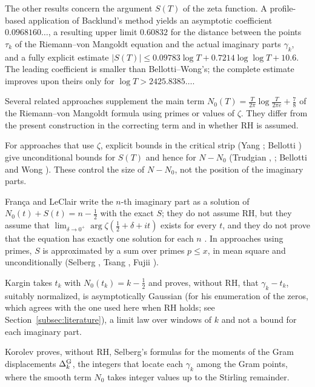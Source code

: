 \documentclass[11pt,a4paper]{article}
\makeatletter
\numberwithin{equation}{section}
\DeclareRobustCommand{\CGref}[1]{\ref{#1}}
\DeclareRobustCommand{\CGcite}[2][]{\if\relax\detokenize{#1}\relax\cite{#2}\else\cite[#1]{#2}\fi}
\let\CG@origref\ref
\newcommand{\CG@gettip}[1]{\@ifundefined{CGTip@#1}{#1}{\csname CGTip@#1\endcsname}}
\newcommand{\CG@getbib}[1]{\@ifundefined{CGBib@#1}{#1}{\csname CGBib@#1\endcsname}}
\DeclareRobustCommand{\CGref}[1]{\pdftooltip{\CG@origref{#1}}{\CG@gettip{#1}}}
\DeclareRobustCommand{\CGcite}[2][]{\pdftooltip{\if\relax\detokenize{#1}\relax\cite{#2}\else\cite[#1]{#2}\fi}{\CG@getbib{#2}}}
\theoremstyle{definition}
\theoremstyle{remark}
\newcommand{\Nz}{N_0} %
\makeatother
\begin{document}
The other results concern the argument $S(T)$ of the zeta function. A profile-based application of Backlund's method yields an asymptotic coefficient $0.0968160\ldots$, a resulting upper limit $0.60832$ for the distance between the points $\tau_k$ of the Riemann--von Mangoldt equation and the actual imaginary parts $\gamma_k$, and a fully explicit estimate $|S(T)|\le0.09783\log T+0.7214\log\log T+10.6$. The leading coefficient is smaller than Bellotti--Wong's; the complete estimate improves upon theirs only for $\log T>2425.8385\ldots$.

Several related approaches supplement the main term $\Nz(T)=\frac{T}{2\pi}\log\frac{T}{2\pi e}+\frac78$ of the Riemann--von Mangoldt formula using primes or values of $\zeta$. They differ from the present construction in the correcting term and in whether RH is assumed.

For approaches that use $\zeta$, explicit bounds in the critical strip (Yang \CGcite{Yang2024}; Bellotti \CGcite{Bellotti2024}) give unconditional bounds for $S(T)$ and hence for $N-\Nz$ (Trudgian \CGcite{Trudgian2012}, \CGcite{Trudgian2014}; Bellotti and Wong \CGcite[Thm.~1.1, Cor.~1.5]{BellottiWong2025}). These control the size of $N-\Nz$, not the position of the imaginary parts.

Fran\c{c}a and LeClair \CGcite[eq.~(20)]{FrancaLeClair2015} write the $n$-th imaginary part as a solution of $\Nz(t)+S(t)=n-\frac12$ with the exact $S$; they do not assume RH, but they assume that $\lim_{\delta\to0^+}\arg\zeta(\frac12+\delta+it)$ exists for every $t$, and they do not prove that the equation has exactly one solution for each $n$ \CGcite[\S9]{FrancaLeClair2015}. In approaches using primes, $S$ is approximated by a sum over primes $p\le x$, in mean square and unconditionally (Selberg \CGcite{Selberg1946a}, Tsang \CGcite{Tsang1984}, Fujii \CGcite{Fujii1974}).

Kargin \CGcite[Thm.~1.1]{Kargin2013} takes $t_k$ with $\Nz(t_k)=k-\frac12$ and proves, without RH, that $\gamma_k-t_k$, suitably normalized, is asymptotically Gaussian (for his enumeration of the zeros, which agrees with the one used here when RH holds; see Section~\CGref{subsec:literature}), a limit law over windows of $k$ and not a bound for each imaginary part.

Korolev \CGcite[Thm.~4.2]{Korolev2012} proves, without RH, Selberg's formulas for the moments of the Gram displacements $\Delta^{\rm G}_k$, the integers that locate each $\gamma_k$ among the Gram points, where the smooth term $\Nz$ takes integer values up to the Stirling remainder.
\end{document}
